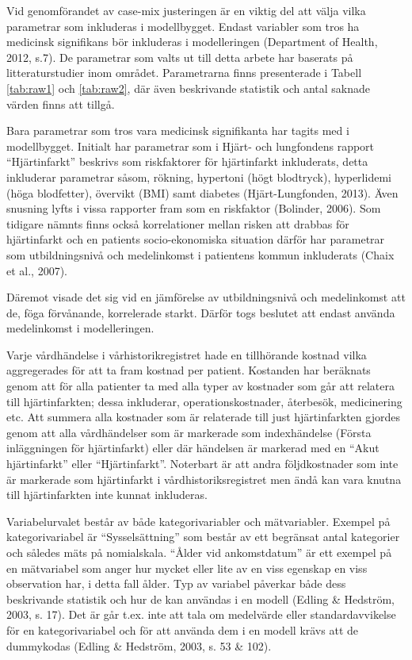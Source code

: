 Vid genomförandet av case-mix justeringen är en viktig del att välja vilka parametrar som inkluderas i modellbygget. Endast variabler som tros ha medicinsk signifikans bör inkluderas i modelleringen (Department of Health, 2012, s.7). De parametrar som valts ut till detta arbete har baserats på litteraturstudier inom området. Parametrarna finns presenterade i Tabell \ref{tab:raw1} och \ref{tab:raw2}, där även beskrivande statistik och antal saknade värden finns att tillgå.

Bara parametrar som tros vara medicinsk signifikanta har tagits med i modellbygget. Initialt har parametrar som i Hjärt- och lungfondens rapport “Hjärtinfarkt” beskrivs som riskfaktorer för hjärtinfarkt inkluderats, detta inkluderar parametrar såsom, rökning, hypertoni (högt blodtryck), hyperlidemi (höga blodfetter), övervikt (BMI) samt diabetes (Hjärt-Lungfonden, 2013). Även snusning lyfts i vissa rapporter fram som en riskfaktor (Bolinder, 2006). Som tidigare nämnts finns också korrelationer mellan risken att drabbas för hjärtinfarkt och en patients socio-ekonomiska situation därför har parametrar som utbildningsnivå och medelinkomst i patientens kommun inkluderats (Chaix et al., 2007).

Däremot visade det sig vid en jämförelse av utbildningsnivå och medelinkomst att de, föga förvånande, korrelerade starkt. Därför togs beslutet att endast använda medelinkomst i modelleringen.

Varje vårdhändelse i vårhistorikregistret hade en tillhörande kostnad vilka aggregerades för att ta fram kostnad per patient. Kostanden har beräknats genom att för alla patienter ta med alla typer av kostnader som går att relatera till hjärtinfarkten; dessa inkluderar, operationskostnader, återbesök, medicinering etc. Att summera alla kostnader som är relaterade till just hjärtinfarkten gjordes genom att alla vårdhändelser som är markerade som indexhändelse (Första inläggningen för hjärtinfarkt) eller där händelsen är markerad med en “Akut hjärtinfarkt” eller “Hjärtinfarkt”. Noterbart är att andra följdkostnader som inte är markerade som hjärtinfarkt i vårdhistoriksregistret men ändå kan vara knutna till hjärtinfarkten inte kunnat inkluderas.


Variabelurvalet består av både kategorivariabler och mätvariabler. Exempel på kategorivariabel är “Sysselsättning” som består av ett begränsat antal kategorier och således mäts på nomialskala. “Ålder vid ankomstdatum” är ett exempel på en mätvariabel som anger hur mycket eller lite av en viss egenskap en viss observation har, i detta fall ålder. Typ av variabel påverkar både dess beskrivande statistik och hur de kan användas i en modell (Edling \& Hedström, 2003, s. 17). Det är går t.ex. inte att tala om medelvärde eller standardavvikelse för en kategorivariabel och för att använda dem i en modell krävs att de dummykodas (Edling \& Hedström, 2003, s. 53 \& 102).

